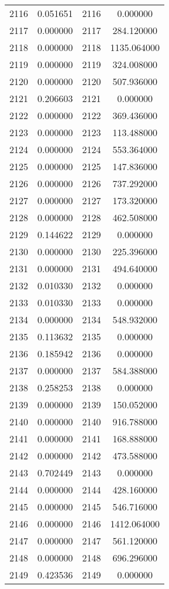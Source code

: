\documentclass[12pt]{article}
\begin{document}
\begin{longtable}{@{}cccc@{}}
2116 & 0.051651 & 2116 & 0.000000 \\
2117 & 0.000000 & 2117 & 284.120000 \\
2118 & 0.000000 & 2118 & 1135.064000 \\
2119 & 0.000000 & 2119 & 324.008000 \\
2120 & 0.000000 & 2120 & 507.936000 \\
2121 & 0.206603 & 2121 & 0.000000 \\
2122 & 0.000000 & 2122 & 369.436000 \\
2123 & 0.000000 & 2123 & 113.488000 \\
2124 & 0.000000 & 2124 & 553.364000 \\
2125 & 0.000000 & 2125 & 147.836000 \\
2126 & 0.000000 & 2126 & 737.292000 \\
2127 & 0.000000 & 2127 & 173.320000 \\
2128 & 0.000000 & 2128 & 462.508000 \\
2129 & 0.144622 & 2129 & 0.000000 \\
2130 & 0.000000 & 2130 & 225.396000 \\
2131 & 0.000000 & 2131 & 494.640000 \\
2132 & 0.010330 & 2132 & 0.000000 \\
2133 & 0.010330 & 2133 & 0.000000 \\
2134 & 0.000000 & 2134 & 548.932000 \\
2135 & 0.113632 & 2135 & 0.000000 \\
2136 & 0.185942 & 2136 & 0.000000 \\
2137 & 0.000000 & 2137 & 584.388000 \\
2138 & 0.258253 & 2138 & 0.000000 \\
2139 & 0.000000 & 2139 & 150.052000 \\
2140 & 0.000000 & 2140 & 916.788000 \\
2141 & 0.000000 & 2141 & 168.888000 \\
2142 & 0.000000 & 2142 & 473.588000 \\
2143 & 0.702449 & 2143 & 0.000000 \\
2144 & 0.000000 & 2144 & 428.160000 \\
2145 & 0.000000 & 2145 & 546.716000 \\
2146 & 0.000000 & 2146 & 1412.064000 \\
2147 & 0.000000 & 2147 & 561.120000 \\
2148 & 0.000000 & 2148 & 696.296000 \\
2149 & 0.423536 & 2149 & 0.000000 \\

\end{longtable}
\end{document}
